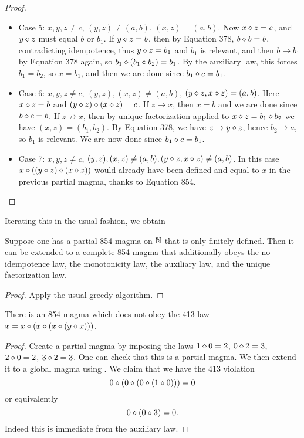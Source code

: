 \begin{proof}
\begin{itemize}
  \item Case 5: $x,y,z \neq c$, $(y,z) \neq (a,b)$, $(x,z) = (a,b)$.  Now $x \diamond z = c$, and $y \diamond z$ must equal $b$ or $b_1$.  If $y \diamond z = b$, then by Equation 378, $b \diamond b = b$, contradicting idempotence, thus $y \diamond z = b_1$ and $b_1$ is relevant, and then $b \to b_1$ by Equation 378 again, so $b_1 \diamond (b_1 \diamond b_2) = b_1$.  By the auxiliary law, this forces $b_1 = b_2$, so $x = b_1$, and then we are done since $b_1 \diamond c = b_1$.
  \item Case 6: $x,y,z \neq c$, $(y,z), (x,z) \neq (a,b)$, $(y \diamond z, x \diamond z) = (a,b)$.  Here $x \diamond z = b$ and $(y \diamond z) \diamond (x \diamond z) = c$.  If $z \to x$, then $x=b$ and we are done since $b \diamond c = b$.  If $z \not \to x$, then by unique factorization applied to $x \diamond z = b_1 \diamond b_2$ we have $(x,z) = (b_1,b_2)$.  By Equation 378, we have $z \to y \diamond z$, hence $b_2 \to a$, so $b_1$ is relevant.  We are now done since $b_1 \diamond c = b_1$.
  \item Case 7: $x,y,z \neq c$, $(y,z), (x,z) \neq (a,b), (y \diamond z, x \diamond z) \neq (a,b)$.  In this case $x \diamond ((y \diamond z) \diamond (x \diamond z))$ would already have been defined and equal to $x$ in the previous partial magma, thanks to Equation 854.
\end{itemize}
\end{proof}

Iterating this in the usual fashion, we obtain

\begin{corollary}[854 extension]\label{extend-854}\leanok{}
Suppose one has a partial 854 magma on $\mathbb{N}$ that is only finitely defined.  Then it can be extended to a complete 854 magma that additionally obeys the no idempotence law, the monotonicity law, the auxiliary law, and the unique factorization law.
\end{corollary}

\begin{proof}  Apply the usual greedy algorithm.
\end{proof}

\begin{corollary}\leanok{}\label{854-413}  There is an 854 magma which does not obey the 413 law $x = x \diamond (x \diamond (x \diamond (y \diamond x)))$.
\end{corollary}

\begin{proof} Create a partial magma by imposing the laws $1 \diamond 0 = 2$, $0 \diamond 2 = 3$, $2 \diamond 0 = 2$, $3 \diamond 2 = 3$.  One can check that this is a partial magma.  We then extend it to a global magma using .  We claim that we have the 413 violation
  $$ 0 \diamond (0 \diamond (0 \diamond (1 \diamond 0))) = 0$$
  or equivalently
  $$ 0 \diamond (0 \diamond 3) = 0.$$
Indeed this is immediate from the auxiliary law.
\end{proof}

